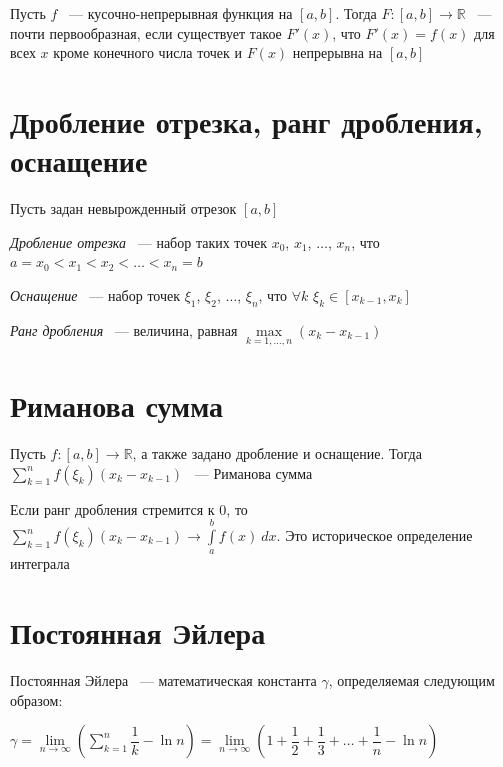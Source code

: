 \documentclass{article}
\begin{document}
		Пусть $f$ ~--- кусочно-непрерывная функция на $[a, b]$. Тогда $F : [a, b] \rightarrow \mathbb{R}$ ~--- почти первообразная, если существует такое $F'(x)$, что $F'(x) = f(x)$ для всех $x$ кроме конечного числа точек и $F(x)$ непрерывна на $[a, b]$

	\newpage

	\section{Дробление отрезка, ранг дробления, оснащение}

		Пусть задан невырожденный отрезок $[a, b]$

		\textit{Дробление отрезка} ~--- набор таких точек $x_0$, $x_1$, $\ldots$, $x_n$, что $a = x_0 < x_1 < x_2 < \ldots < x_n = b$

		\textit{Оснащение} ~--- набор точек $\xi_1$, $\xi_2$, $\ldots$, $\xi_n$, что $\forall k$ $\xi_k \in [x_{k - 1}, x_k]$

		\textit{Ранг дробления} ~--- величина, равная $\max\limits_{k = 1, \ldots, n} (x_k - x_{k - 1})$
	
	\newpage

	\section{Риманова сумма}

		Пусть $f : [a, b] \rightarrow \mathbb{R}$, а также задано дробление и оснащение. Тогда $\sum\limits^n_{k = 1} f(\xi_k) (x_k - x_{k - 1})$ ~--- Риманова сумма

		Если ранг дробления стремится к $0$, то $\sum\limits^n_{k = 1} f(\xi_k)(x_k - x_{k - 1}) \rightarrow \int\limits^b_a f(x) \ dx$. Это историческое определение интеграла

	\newpage

	\section{Постоянная Эйлера}
    
        Постоянная Эйлера ~--- математическая константа $\gamma$, определяемая следующим образом:
        
        $\gamma = \lim\limits_{n \rightarrow \infty} \left( \sum\limits^n_{k = 1} \dfrac{1}{k} - \ln{n} \right) = \lim\limits_{n \rightarrow \infty} \left( 1 + \dfrac{1}{2} + \dfrac{1}{3} + \ldots + \dfrac{1}{n} - \ln{n} \right)$
        
	\newpage
	
\end{document}
